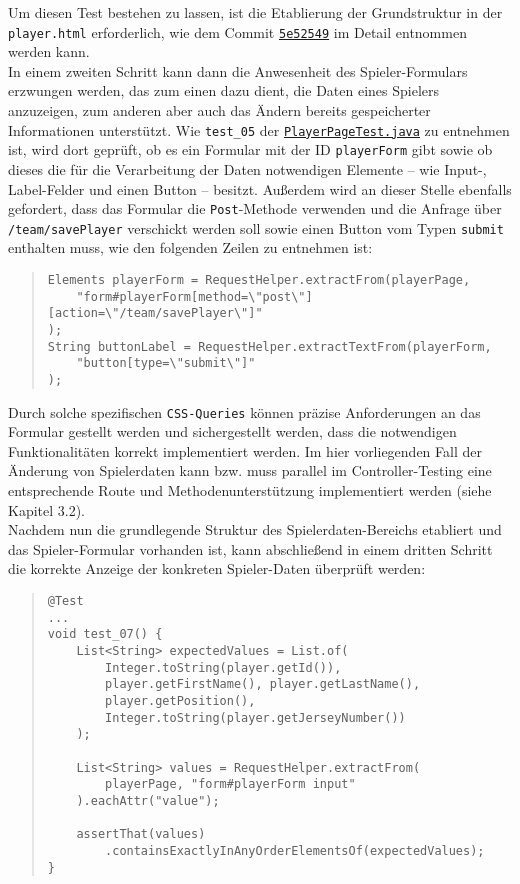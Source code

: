 Um diesen Test bestehen zu lassen, ist die Etablierung der Grundstruktur in der 
\texttt{player.html} erforderlich, wie dem Commit 
\href{https://github.com/FlorianOhmes/bat_spielzeitenplaner/commit/5e52549a16792f66ea818041bc364e6b3e5ac219}{\texttt{5e52549}}
im Detail entnommen werden kann. \\ 
In einem zweiten Schritt kann dann die Anwesenheit des Spieler-Formulars erzwungen 
werden, das zum einen dazu dient, die Daten eines Spielers anzuzeigen, zum anderen 
aber auch das Ändern bereits gespeicherter Informationen unterstützt. Wie 
\texttt{test\_05} der 
\href{https://github.com/FlorianOhmes/bat_spielzeitenplaner/blob/main/spielzeitenplaner/src/test/java/de/bathesis/spielzeitenplaner/templates/team/PlayerPageTest.java}{\texttt{PlayerPageTest.java}}
zu entnehmen ist, wird dort geprüft, ob es ein Formular mit der ID 
\texttt{playerForm} gibt sowie ob dieses die für die Verarbeitung der Daten 
notwendigen Elemente -- wie Input-, Label-Felder und einen Button -- besitzt. 
Außerdem wird an dieser Stelle ebenfalls gefordert, dass das Formular die 
\texttt{Post}-Methode verwenden und die Anfrage über \texttt{/team/savePlayer}
verschickt werden soll sowie einen Button vom Typen \texttt{submit} enthalten muss, 
wie den folgenden Zeilen zu entnehmen ist: 

\begin{quote}
\begin{verbatim}
Elements playerForm = RequestHelper.extractFrom(playerPage, 
    "form#playerForm[method=\"post\"][action=\"/team/savePlayer\"]"
);
String buttonLabel = RequestHelper.extractTextFrom(playerForm, 
    "button[type=\"submit\"]"
);
\end{verbatim}
\end{quote}

Durch solche spezifischen \texttt{CSS-Queries} können präzise Anforderungen an das 
Formular gestellt werden und sichergestellt werden, dass die notwendigen 
Funktionalitäten korrekt implementiert werden. Im hier vorliegenden Fall der 
Änderung von Spielerdaten kann bzw. muss parallel im Controller-Testing eine 
entsprechende Route und Methodenunterstützung implementiert werden (siehe Kapitel 
3.2). \\ 
Nachdem nun die grundlegende Struktur des Spielerdaten-Bereichs etabliert und das 
Spieler-Formular vorhanden ist, kann abschließend in einem dritten Schritt die 
korrekte Anzeige der konkreten Spieler-Daten überprüft werden: 

\begin{quote}
\begin{verbatim}
@Test
...
void test_07() {
    List<String> expectedValues = List.of(
        Integer.toString(player.getId()), 
        player.getFirstName(), player.getLastName(), 
        player.getPosition(), 
        Integer.toString(player.getJerseyNumber())
    );

    List<String> values = RequestHelper.extractFrom(
        playerPage, "form#playerForm input"
    ).eachAttr("value");

    assertThat(values)
        .containsExactlyInAnyOrderElementsOf(expectedValues);
}
\end{verbatim}
\end{quote}

